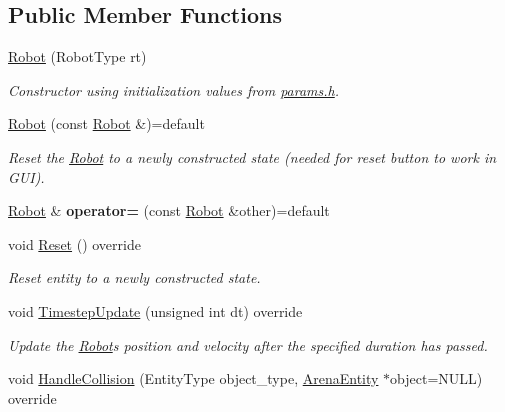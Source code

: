 \subsection*{Public Member Functions}
\begin{DoxyCompactItemize}
\item 
\hyperlink{class_robot_a3475f306d3a9b7090e31a12399260055}{Robot} (Robot\+Type rt)\hypertarget{class_robot_a3475f306d3a9b7090e31a12399260055}{}\label{class_robot_a3475f306d3a9b7090e31a12399260055}

\begin{DoxyCompactList}\small\item\em Constructor using initialization values from \hyperlink{params_8h}{params.\+h}. \end{DoxyCompactList}\item 
\hyperlink{class_robot_a4fd835c7c44337d31d9fd09921d29908}{Robot} (const \hyperlink{class_robot}{Robot} \&)=default\hypertarget{class_robot_a4fd835c7c44337d31d9fd09921d29908}{}\label{class_robot_a4fd835c7c44337d31d9fd09921d29908}

\begin{DoxyCompactList}\small\item\em Reset the \hyperlink{class_robot}{Robot} to a newly constructed state (needed for reset button to work in G\+UI). \end{DoxyCompactList}\item 
\hyperlink{class_robot}{Robot} \& {\bfseries operator=} (const \hyperlink{class_robot}{Robot} \&other)=default\hypertarget{class_robot_a69f171c4965ac4523cd95e2191405d37}{}\label{class_robot_a69f171c4965ac4523cd95e2191405d37}

\item 
void \hyperlink{class_robot_af597fd14927d2cd5308ded62f4e54e29}{Reset} () override\hypertarget{class_robot_af597fd14927d2cd5308ded62f4e54e29}{}\label{class_robot_af597fd14927d2cd5308ded62f4e54e29}

\begin{DoxyCompactList}\small\item\em Reset entity to a newly constructed state. \end{DoxyCompactList}\item 
void \hyperlink{class_robot_ae790462f8782efcfd26082eedec30ed5}{Timestep\+Update} (unsigned int dt) override
\begin{DoxyCompactList}\small\item\em Update the \hyperlink{class_robot}{Robot}\textquotesingle{}s position and velocity after the specified duration has passed. \end{DoxyCompactList}\item 
void \hyperlink{class_robot_a4fc6b01fec869b559197d8e4b9686249}{Handle\+Collision} (Entity\+Type object\+\_\+type, \hyperlink{class_arena_entity}{Arena\+Entity} $\ast$object=N\+U\+LL) override\hypertarget{class_robot_a4fc6b01fec869b559197d8e4b9686249}{}\label{class_robot_a4fc6b01fec869b559197d8e4b9686249}


\end{DoxyCompactItemize}
